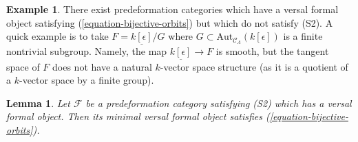 \documentclass{stacks-project}
\theoremstyle{plain}
\newtheorem{lemma}[subsection]{Lemma}
\theoremstyle{definition}
\newtheorem{example}[subsection]{Example}
\theoremstyle{remark}
\numberwithin{equation}{subsection}
\begin{document}
\begin{example}
\label{example-do-not-get-S2}
There exist predeformation categories which have a versal formal
object satisfying (\ref{equation-bijective-orbits}) but which do not
satisfy (S2). A quick example is to take $F = \underline{k[\epsilon]}/G$
where $G \subset \text{Aut}_{\mathcal{C}_\Lambda}(k[\epsilon])$
is a finite nontrivial subgroup. Namely, the map
$\underline{k[\epsilon]} \to F$ is smooth, but the tangent space
of $F$ does not have a natural $k$-vector space structure (as it is
a quotient of a $k$-vector space by a finite group).
\end{example}

\begin{lemma}
\label{lemma-construct-bijective-orbits}
Let $\mathcal{F}$ be a predeformation category satisfying
(S2) which has a versal formal object. Then its minimal versal
formal object satisfies (\ref{equation-bijective-orbits}).
\end{lemma}
\end{document}
